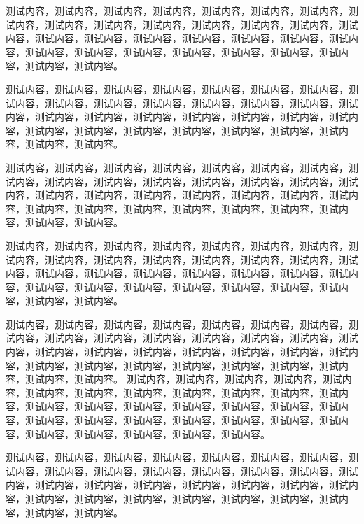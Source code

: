 \documentclass[twocolumn,answer,full,c5s]{HPUexam}
\begin{document}
\vspace{45ex}
测试内容，测试内容，测试内容，测试内容，测试内容，测试内容，测试内容，测试内容，测试内容，测试内容，测试内容，测试内容，测试内容，测试内容，测试内容，测试内容，测试内容，测试内容，测试内容，测试内容，测试内容，测试内容，测试内容，测试内容，测试内容，测试内容，测试内容，测试内容，测试内容，测试内容，测试内容。

测试内容，测试内容，测试内容，测试内容，测试内容，测试内容，测试内容，测试内容，测试内容，测试内容，测试内容，测试内容，测试内容，测试内容，测试内容，测试内容，测试内容，测试内容，测试内容，测试内容，测试内容，测试内容，测试内容，测试内容，测试内容，测试内容，测试内容，测试内容，测试内容，测试内容，测试内容。

测试内容，测试内容，测试内容，测试内容，测试内容，测试内容，测试内容，测试内容，测试内容，测试内容，测试内容，测试内容，测试内容，测试内容，测试内容，测试内容，测试内容，测试内容，测试内容，测试内容，测试内容，测试内容，测试内容，测试内容，测试内容，测试内容，测试内容，测试内容，测试内容，测试内容，测试内容。

测试内容，测试内容，测试内容，测试内容，测试内容，测试内容，测试内容，测试内容，测试内容，测试内容，测试内容，测试内容，测试内容，测试内容，测试内容，测试内容，测试内容，测试内容，测试内容，测试内容，测试内容，测试内容，测试内容，测试内容，测试内容，测试内容，测试内容，测试内容，测试内容，测试内容，测试内容。

测试内容，测试内容，测试内容，测试内容，测试内容，测试内容，测试内容，测试内容，测试内容，测试内容，测试内容，测试内容，测试内容，测试内容，测试内容，测试内容，测试内容，测试内容，测试内容，测试内容，测试内容，测试内容，测试内容，测试内容，测试内容，测试内容，测试内容，测试内容，测试内容，测试内容，测试内容。
测试内容，测试内容，测试内容，测试内容，测试内容，测试内容，测试内容，测试内容，测试内容，测试内容，测试内容，测试内容，测试内容，测试内容，测试内容，测试内容，测试内容，测试内容，测试内容，测试内容，测试内容，测试内容，测试内容，测试内容，测试内容，测试内容，测试内容，测试内容，测试内容，测试内容，测试内容。

测试内容，测试内容，测试内容，测试内容，测试内容，测试内容，测试内容，测试内容，测试内容，测试内容，测试内容，测试内容，测试内容，测试内容，测试内容，测试内容，测试内容，测试内容，测试内容，测试内容，测试内容，测试内容，测试内容，测试内容，测试内容，测试内容，测试内容，测试内容，测试内容，测试内容，测试内容。
\end{document}
